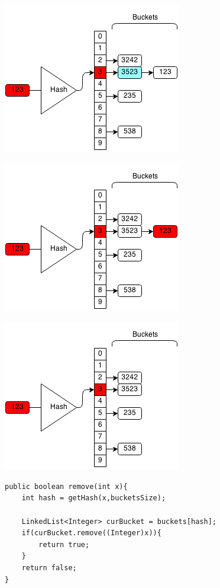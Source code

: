 \documentclass[11pt,oneside]{book}
\makeatletter
\def\maxwidth#1{\ifdim\Gin@nat@width>#1 #1\else\Gin@nat@width\fi}
\makeatother
\begin{document}
\vspace{5px}\includegraphics[width=\maxwidth{\textwidth}]{hashsetrem.png}

\vspace{5px}\includegraphics[width=\maxwidth{\textwidth}]{hashsetrem2.png}

\vspace{5px}\includegraphics[width=\maxwidth{\textwidth}]{hashsetrem3.png}

\begin{lstlisting}
public boolean remove(int x){
    int hash = getHash(x,bucketsSize);
    
    LinkedList<Integer> curBucket = buckets[hash];
    if(curBucket.remove((Integer)x)){
        return true;
    }
    return false;
}
\end{lstlisting}
\end{document}

